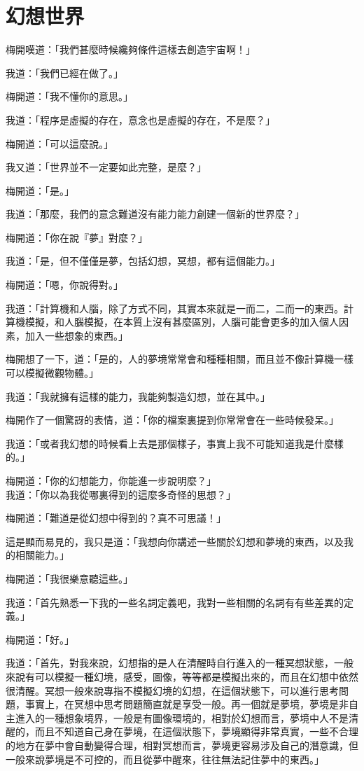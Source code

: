 \chapter{幻想世界}

梅開嘆道：「我們甚麼時候纔夠條件這樣去創造宇宙啊！」

我道：「我們已經在做了。」

梅開道：「我不懂你的意思。」

我道：「程序是虛擬的存在，意念也是虛擬的存在，不是麼？」

梅開道：「可以這麼說。」

我又道：「世界並不一定要如此完整，是麼？」

梅開道：「是。」

我道：「那麼，我們的意念難道沒有能力能力創建一個新的世界麼？」

梅開道：「你在說『夢』對麼？」

我道：「是，但不僅僅是夢，包括幻想，冥想，都有這個能力。」

梅開道：「嗯，你說得對。」

我道：「計算機和人腦，除了方式不同，其實本來就是一而二，二而一的東西。計算機模擬，和人腦模擬，在本質上沒有甚麼區別，人腦可能會更多的加入個人因素，加入一些想象的東西。」

梅開想了一下，道：「是的，人的夢境常常會和種種相關，而且並不像計算機一樣可以模擬微觀物體。」

我道：「我就擁有這樣的能力，我能夠製造幻想，並在其中。」

梅開作了一個驚訝的表情，道：「你的檔案裏提到你常常會在一些時候發呆。」

我道：「或者我幻想的時候看上去是那個樣子，事實上我不可能知道我是什麼樣的。」

梅開道：「你的幻想能力，你能進一步說明麼？」
\\


我道：「你以為我從哪裏得到的這麼多奇怪的思想？」

梅開道：「難道是從幻想中得到的？真不可思議！」

這是顯而易見的，我只是道：「我想向你講述一些關於幻想和夢境的東西，以及我的相關能力。」

梅開道：「我很樂意聽這些。」


我道：「首先熟悉一下我的一些名詞定義吧，我對一些相關的名詞有有些差異的定義。」

梅開道：「好。」

我道：「首先，對我來說，幻想指的是人在清醒時自行進入的一種冥想狀態，一般來說有可以模擬一種幻境，感受，圖像，等等都是模擬出來的，而且在幻想中依然很清醒。冥想一般來說專指不模擬幻境的幻想，在這個狀態下，可以進行思考問題，事實上，在冥想中思考問題簡直就是享受一般。再一個就是夢境，夢境是非自主進入的一種想象境界，一般是有圖像環境的，相對於幻想而言，夢境中人不是清醒的，而且不知道自己身在夢境，在這個狀態下，夢境顯得非常真實，一些不合理的地方在夢中會自動變得合理，相對冥想而言，夢境更容易涉及自己的潛意識，但一般來說夢境是不可控的，而且從夢中醒來，往往無法記住夢中的東西。」

